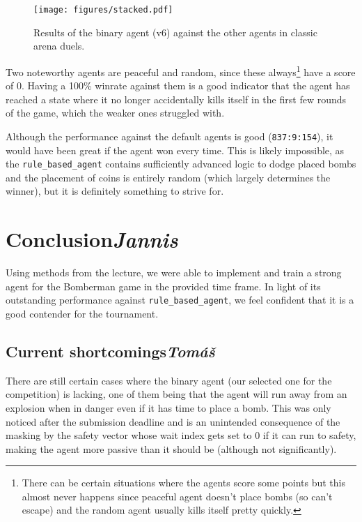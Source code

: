 \documentclass{article}
\begin{document}
\begin{figure}[h]
    \centering
    \texttt{[image: figures/stacked.pdf]}
    \caption{Results of the binary agent (v6) against the other agents in classic arena duels.}
    \label{fig:stacked}
\end{figure}

Two noteworthy agents are peaceful and random, since these always\footnote{There can be certain situations where the agents score some points but this almost never happens since peaceful agent doesn't place bombs (so can't escape) and the random agent usually kills itself pretty quickly.} have a score of 0.
Having a 100\% winrate against them is a good indicator that the agent has reached a state where it no longer accidentally kills itself in the first few rounds of the game, which the weaker ones struggled with.

Although the performance against the default agents is good (\texttt{837:9:154}), it would have been great if the agent won every time.
This is likely impossible, as the \texttt{rule\_based\_agent} contains sufficiently advanced logic to dodge placed bombs and the placement of coins is entirely random (which largely determines the winner), but it is definitely something to strive for.

\clearpage

\section[Conclusion]{Conclusion{\normalsize \normalfont \it \hfill Jannis}}

Using methods from the lecture, we were able to implement and train a strong agent for the Bomberman game in the provided time frame. In light of its outstanding performance against \texttt{rule\_based\_agent}, we feel confident that it is a good contender for the tournament.

\subsection[Current shortcomings]{Current shortcomings{\normalsize \normalfont \it \hfill Tomáš}}

There are still certain cases where the binary agent (our selected one for the competition) is lacking, one of them being that the agent will run away from an explosion when in danger even if it has time to place a bomb.
This was only noticed after the submission deadline and is an unintended consequence of the masking by the safety vector whose wait index gets set to 0 if it can run to safety, making the agent more passive than it should be (although not significantly).
\end{document}
